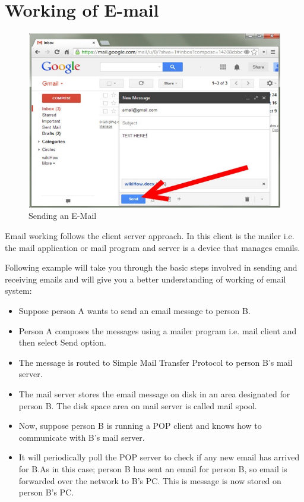 \documentclass[11pt,a4paper,twoside]{article}
\begin{document}
\section{Working of E-mail}
\begin{figure}[H]
\centering \includegraphics[scale=1]{Fig 35.jpg}
\caption{Sending an E-Mail}
\end{figure}
Email working follows the client server approach. In this client is the mailer i.e. the mail application or mail program and server is a device that manages emails.\par
Following example will take you through the basic steps involved in sending and receiving emails and will give you a better understanding of working of email system:
\begin{itemize}
\item Suppose person A wants to send an email message to person B.
\item Person A composes the messages using a mailer program i.e. mail client and then select Send option.
\item The message is routed to Simple Mail Transfer Protocol to person B’s mail server.
\item The mail server stores the email message on disk in an area designated for person B.
The disk space area on mail server is called mail spool.
\item Now, suppose person B is running a POP client and knows how to communicate with B’s mail server.
\item It will periodically poll the POP server to check if any new email has arrived for B.As in this case; person B has sent an email for person B, so email is forwarded over the network to B’s PC. This is message is now stored on person B’s PC.
\end{itemize}
\end{document}
